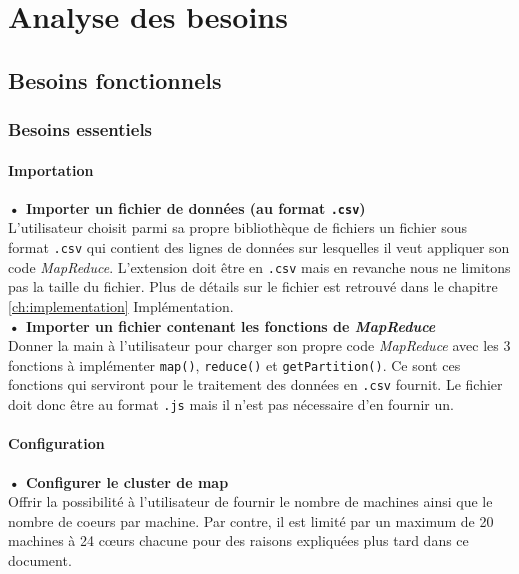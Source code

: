 \chapter{Analyse des besoins}

\section{Besoins fonctionnels}
\subsection{Besoins essentiels}

\subsubsection{Importation}

\textbf{• Importer un fichier de données (au format {\tt .csv})\\} L'utilisateur choisit parmi sa propre bibliothèque de fichiers un fichier sous format {\tt .csv} qui contient des lignes de données sur lesquelles il veut appliquer son code {\it MapReduce}. L'extension doit être en {\tt .csv} mais en revanche nous ne limitons pas la taille du fichier. Plus de détails sur le fichier est retrouvé dans le chapitre \ref{ch:implementation} Implémentation.\\

\textbf{• Importer un fichier contenant les fonctions de {\it MapReduce}\\}   
 Donner la main à l'utilisateur pour charger son propre code {\it MapReduce} avec les 3 fonctions à implémenter {\tt map()}, {\tt reduce()} et {\tt getPartition()}. Ce sont ces fonctions qui serviront pour le traitement des données en {\tt .csv} fournit. Le fichier doit donc être au format {\tt .js} mais il n'est pas nécessaire d'en fournir un.\\

\subsubsection{Configuration} 

\textbf{• Configurer le cluster de map\\ } Offrir la possibilité à l'utilisateur de fournir le nombre de machines ainsi que le nombre de coeurs par machine. Par contre, il est limité par un maximum de 20 machines à 24 cœurs chacune pour des raisons expliquées plus tard dans ce document. \\

